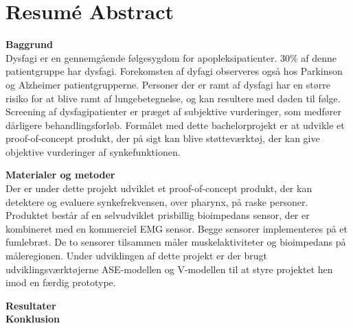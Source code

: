 \chapter{Resumé Abstract}

\textbf{Baggrund}\\
Dysfagi er en gennemgående følgesygdom for apopleksipatienter. 30\% af denne patientgruppe har dysfagi. Forekomsten af dyfagi observeres også hos Parkinson og Alzheimer patientgrupperne. Personer der er ramt af dysfagi har en større risiko for at blive ramt af lungebetegnelse, og kan resultere med døden til følge. Screening af dysfagipatienter er præget af subjektive vurderinger, som medfører dårligere behandlingsforløb. Formålet med dette bachelorprojekt er at udvikle et proof-of-concept produkt, der på sigt kan blive støtteværktøj, der kan give objektive vurderinger af synkefunktionen.

\textbf{Materialer og metoder}\\
Der er under dette projekt udviklet et proof-of-concept produkt, der kan detektere og evaluere synkefrekvensen, over pharynx, på raske personer. Produktet består af en selvudviklet prisbillig bioimpedans sensor, der er kombineret med en kommerciel EMG sensor. Begge sensorer implementeres på et fumlebræt. De to sensorer tilsammen måler  muskelaktiviteter og bioimpedans på måleregionen.   Under udviklingen af dette projekt er der brugt udviklingsværktøjerne ASE-modellen og V-modellen til at styre projektet hen imod en færdig prototype.  


\textbf{Resultater}\\



\textbf{Konklusion}\\
